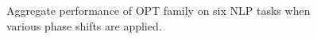 \begin{figure}
    \centering
    \caption{Aggregate performance of OPT family on six NLP tasks when various phase shifts are applied.}
    \label{fig:prompt_ps_aggr}
\end{figure}